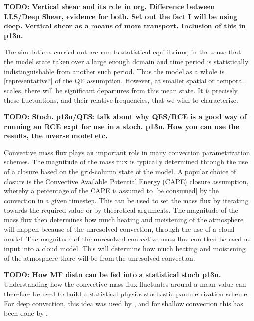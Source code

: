 \documentclass[11pt,a4paper]{article}
\newcommand\todo[1]{\textbf{TODO: #1}}
\begin{document}
\todo{Vertical shear and its role in org. Difference between LLS/Deep Shear, evidence for both. Set out the fact I will be using deep. Vertical shear as a means of mom transport. Inclusion of this in p13n.}

The simulations carried out are run to statistical equilibrium, in the sense that the model state taken over a large enough domain and time period is statistically indistinguishable from another such period. Thus the model as a whole is [representative?] of the QE assumption. However, at smaller spatial or temporal scales, there will be significant departures from this mean state. It is precisely these fluctuations, and their relative frequencies, that we wish to characterize.

\todo{Stoch. p13n/QES: talk about why QES/RCE is a good way of running an RCE expt for use in a stoch. p13n. How you can use the results, the inverse model etc.}

Convective mass flux plays an important role in many convection parametrization schemes. The magnitude of the mass flux is typically determined through the use of a closure based on the grid-column state of the model. A popular choice of closure is the Convective Available Potential Energy (CAPE) closure assumption, whereby a percentage of the CAPE is assumed to [be consumed] by the convection in a given timestep. This can be used to set the mass flux by iterating towards the required value or by theoretical arguments. The magnitude of the mass flux then determines how much heating and moistening of the atmosphere will happen because of the unresolved convection, through the use of a cloud model.
The magnitude of the unresolved convective mass flux can then be used as input into a cloud model. This will determine how much heating and moistening of the atmosphere there will be from the unresolved convection.

\todo{How MF distn can be fed into a statistical stoch p13n.}
Understanding how the convective mass flux fluctuates around a mean value can therefore be used to build a statistical physics stochastic parametrization scheme. For deep convection, this idea was used by \cite{PC2008}, and for shallow convection this has been done by \cite{sakradzija2016stochastic}. 

\end{document}

